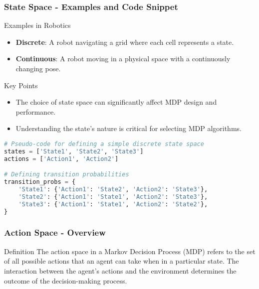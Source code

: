 \documentclass[aspectratio=169]{beamer}
\begin{document}
\begin{frame}[fragile]
    \frametitle{State Space - Examples and Code Snippet}
    \begin{block}{Examples in Robotics}
        \begin{itemize}
            \item \textbf{Discrete}: A robot navigating a grid where each cell represents a state.
            \item \textbf{Continuous}: A robot moving in a physical space with a continuously changing pose.
        \end{itemize}
    \end{block}
    
    \begin{block}{Key Points}
        \begin{itemize}
            \item The choice of state space can significantly affect MDP design and performance.
            \item Understanding the state's nature is critical for selecting MDP algorithms.
        \end{itemize}
    \end{block}
    
    \begin{lstlisting}[language=Python, caption=Code Example: Defining Discrete State Space]
# Pseudo-code for defining a simple discrete state space
states = ['State1', 'State2', 'State3']
actions = ['Action1', 'Action2']

# Defining transition probabilities
transition_probs = {
    'State1': {'Action1': 'State2', 'Action2': 'State3'},
    'State2': {'Action1': 'State1', 'Action2': 'State3'},
    'State3': {'Action1': 'State1', 'Action2': 'State2'},
}
    \end{lstlisting}
\end{frame}

\begin{frame}[fragile]
    \frametitle{Action Space - Overview}
    \begin{block}{Definition}
        The action space in a Markov Decision Process (MDP) refers to the set of all possible actions that an agent can take when in a particular state. The interaction between the agent's actions and the environment determines the outcome of the decision-making process.
    \end{block}
\end{frame}
\end{document}
